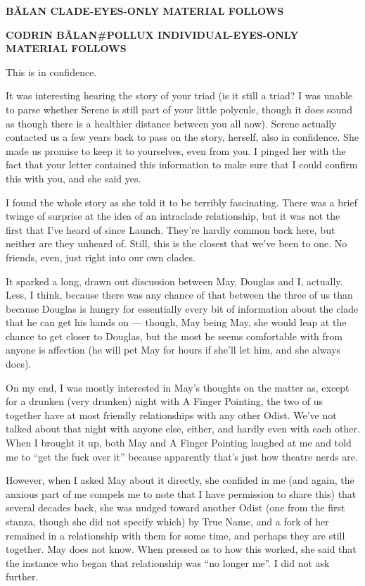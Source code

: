 \textbf{BĂLAN CLADE-EYES-ONLY MATERIAL FOLLOWS}

\textbf{CODRIN BĂLAN\#POLLUX INDIVIDUAL-EYES-ONLY MATERIAL FOLLOWS}

This is in confidence.

It was interesting hearing the story of your triad (is it still a triad? I was unable to parse whether Serene is still part of your little polycule, though it does sound as though there is a healthier distance between you all now). Serene actually contacted us a few years back to pass on the story, herself, also in confidence. She made us promise to keep it to yourselves, even from you. I pinged her with the fact that your letter contained this information to make sure that I could confirm this with you, and she said yes.

I found the whole story as she told it to be terribly fascinating. There was a brief twinge of surprise at the idea of an intraclade relationship, but it was not the first that I've heard of since Launch. They're hardly common back here, but neither are they unheard of. Still, this is the closest that we've been to one. No friends, even, just right into our own clades.

It sparked a long, drawn out discussion between May, Douglas and I, actually. Less, I think, because there was any chance of that between the three of us than because Douglas is hungry for essentially every bit of information about the clade that he can get his hands on — though, May being May, she would leap at the chance to get closer to Douglas, but the most he seems comfortable with from anyone is affection (he will pet May for hours if she'll let him, and she always does).

On my end, I was mostly interested in May's thoughts on the matter as, except for a drunken (very drunken) night with A Finger Pointing, the two of us together have at most friendly relationships with any other Odist. We've not talked about that night with anyone else, either, and hardly even with each other. When I brought it up, both May and A Finger Pointing laughed at me and told me to ``get the fuck over it'' because apparently that's just how theatre nerds are.

However, when I asked May about it directly, she confided in me (and again, the anxious part of me compels me to note that I have permission to share this) that several decades back, she was nudged toward another Odist (one from the first stanza, though she did not specify which) by True Name, and a fork of her remained in a relationship with them for some time, and perhaps they are still together. May does not know. When pressed as to how this worked, she said that the instance who began that relationship was ``no longer me''. I did not ask further.

